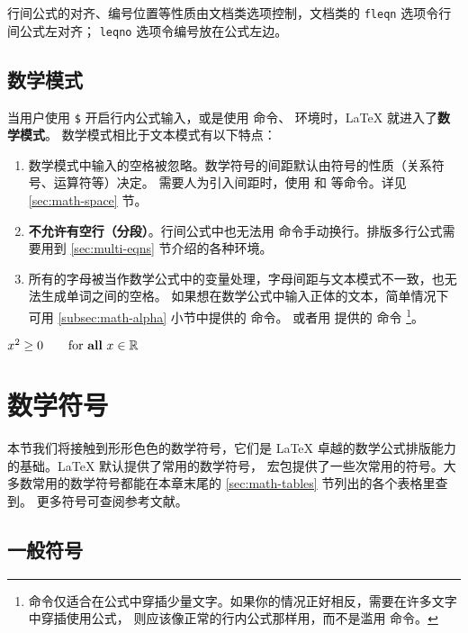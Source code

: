 行间公式的对齐、编号位置等性质由文档类选项控制，文档类的 \texttt{fleqn} 选项令行间公式左对齐；
\texttt{leqno} 选项令编号放在公式左边。

\subsection{数学模式}\label{subsec:math-mode}

当用户使用 \texttt\$ 开启行内公式输入，或是使用 \cmd{[} 命令、 环境时，\LaTeX{} 就进入了\textbf{数学模式}。
数学模式相比于文本模式有以下特点：
\begin{enumerate}
  \item 数学模式中输入的空格被忽略。数学符号的间距默认由符号的性质（关系符号、运算符等）决定。
  需要人为引入间距时，使用  和  等命令。详见 \ref{sec:math-space} 节。
  \item \textbf{不允许有空行（分段）}。行间公式中也无法用 \crcmd{} 命令手动换行。排版多行公式需要用到
  \ref{sec:multi-eqns} 节介绍的各种环境。
  \item 所有的字母被当作数学公式中的变量处理，字母间距与文本模式不一致，也无法生成单词之间的空格。
  如果想在数学公式中输入正体的文本，简单情况下可用 \ref{subsec:math-alpha} 小节中提供的  命令。
  或者用  提供的  命令%
  \footnote{ 命令仅适合在公式中穿插少量文字。如果你的情况正好相反，需要在许多文字中穿插使用公式，
  则应该像正常的行内公式那样用，而不是滥用  命令。}。
\end{enumerate}
\begin{example}
$x^{2} \geq 0 \qquad
\text{for \textbf{all} }
x\in\mathbb{R}$
\end{example}

\section{数学符号}\label{sec:math-symbols}

\def\msym#1{$\csname #1\endcsname$ (\cmd{#1})}

本节我们将接触到形形色色的数学符号，它们是 \LaTeX{} 卓越的数学公式排版能力的基础。\LaTeX{} 默认提供了常用的数学符号，
 宏包提供了一些次常用的符号。大多数常用的数学符号都能在本章末尾的 \ref{sec:math-tables} 节列出的各个表格里查到。
更多符号可查阅参考文献\cite{symbols}。

\subsection{一般符号}\label{subsec:math-general}

